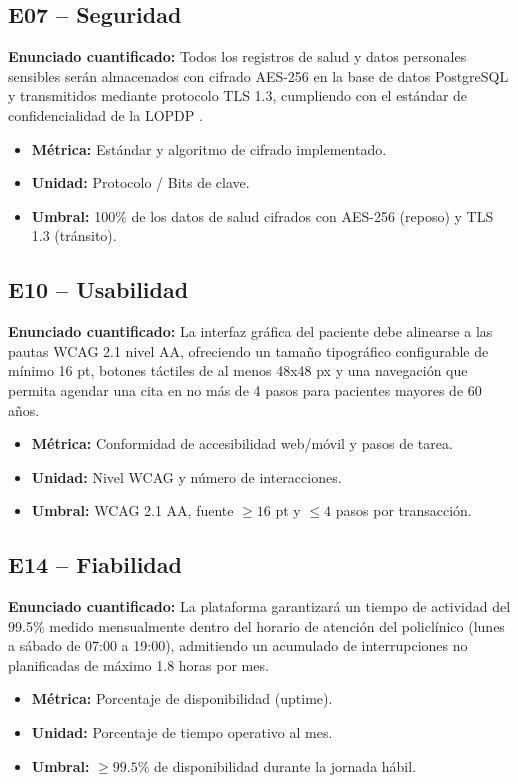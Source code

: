 \documentclass[11pt, a4paper]{article}
\begin{document}
\subsection{E07 -- Seguridad}
\textbf{Enunciado cuantificado:} Todos los registros de salud y datos personales sensibles ser\'an almacenados con cifrado AES-256 en la base de datos PostgreSQL y transmitidos mediante protocolo TLS 1.3, cumpliendo con el est\'andar de confidencialidad de la LOPDP \cite{lopdp2021}.
\begin{itemize}
    \item \textbf{M\'etrica:} Est\'andar y algoritmo de cifrado implementado.
    \item \textbf{Unidad:} Protocolo / Bits de clave.
    \item \textbf{Umbral:} 100\% de los datos de salud cifrados con AES-256 (reposo) y TLS 1.3 (tr\'ansito).
\end{itemize}

\subsection{E10 -- Usabilidad}
\textbf{Enunciado cuantificado:} La interfaz gr\'afica del paciente debe alinearse a las pautas WCAG 2.1 nivel AA, ofreciendo un tama\~no tipogr\'afico configurable de m\'inimo 16 pt, botones t\'actiles de al menos 48x48 px y una navegaci\'on que permita agendar una cita en no m\'as de 4 pasos para pacientes mayores de 60 a\~nos.
\begin{itemize}
    \item \textbf{M\'etrica:} Conformidad de accesibilidad web/m\'ovil y pasos de tarea.
    \item \textbf{Unidad:} Nivel WCAG y n\'umero de interacciones.
    \item \textbf{Umbral:} WCAG 2.1 AA, fuente $\ge 16$ pt y $\le 4$ pasos por transacci\'on.
\end{itemize}

\subsection{E14 -- Fiabilidad}
\textbf{Enunciado cuantificado:} La plataforma garantizar\'a un tiempo de actividad del 99.5\% medido mensualmente dentro del horario de atenci\'on del policl\'inico (lunes a s\'abado de 07:00 a 19:00), admitiendo un acumulado de interrupciones no planificadas de m\'aximo 1.8 horas por mes.
\begin{itemize}
    \item \textbf{M\'etrica:} Porcentaje de disponibilidad (uptime).
    \item \textbf{Unidad:} Porcentaje de tiempo operativo al mes.
    \item \textbf{Umbral:} $\ge 99.5\%$ de disponibilidad durante la jornada h\'abil.
\end{itemize}
\end{document}
